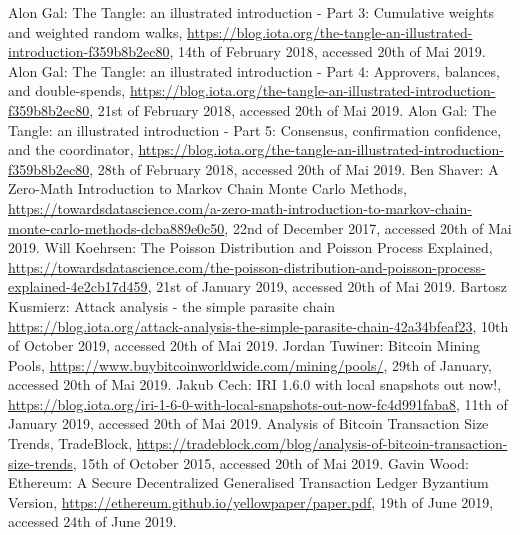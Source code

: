\begin{thebibliography}{99}
 Alon Gal: The Tangle: an illustrated introduction - Part 3: Cumulative weights and weighted random walks, \url{https://blog.iota.org/the-tangle-an-illustrated-introduction-f359b8b2ec80}, 14th of February 2018, accessed 20th of Mai 2019.
 Alon Gal: The Tangle: an illustrated introduction - Part 4: Approvers, balances, and double-spends, \url{https://blog.iota.org/the-tangle-an-illustrated-introduction-f359b8b2ec80}, 21st of February 2018, accessed 20th of Mai 2019.
 Alon Gal: The Tangle: an illustrated introduction - Part 5: Consensus, confirmation confidence, and the coordinator, \url{https://blog.iota.org/the-tangle-an-illustrated-introduction-f359b8b2ec80}, 28th of February 2018, accessed 20th of Mai 2019.
 Ben Shaver: A Zero-Math Introduction to Markov Chain Monte Carlo Methods, \url{https://towardsdatascience.com/a-zero-math-introduction-to-markov-chain-monte-carlo-methods-dcba889e0c50}, 22nd of December 2017, accessed 20th of Mai 2019.
 Will Koehrsen: The Poisson Distribution and Poisson Process Explained, \url{https://towardsdatascience.com/the-poisson-distribution-and-poisson-process-explained-4e2cb17d459}, 21st of January 2019, accessed 20th of Mai 2019.
 Bartosz Kusmierz: Attack analysis - the simple parasite chain \url{https://blog.iota.org/attack-analysis-the-simple-parasite-chain-42a34bfeaf23}, 10th of October 2019, accessed 20th of Mai 2019.
 Jordan Tuwiner: Bitcoin Mining Pools, \url{https://www.buybitcoinworldwide.com/mining/pools/}, 29th of January, accessed 20th of Mai 2019.
 Jakub Cech: IRI 1.6.0 with local snapshots out now!, \url{https://blog.iota.org/iri-1-6-0-with-local-snapshots-out-now-fc4d991faba8}, 11th of January 2019, accessed 20th of Mai 2019.
 Analysis of Bitcoin Transaction Size Trends, TradeBlock, \url{https://tradeblock.com/blog/analysis-of-bitcoin-transaction-size-trends}, 15th of October 2015, accessed 20th of Mai 2019.
 Gavin Wood: Ethereum: A Secure Decentralized Generalised Transaction Ledger Byzantium Version, \url{https://ethereum.github.io/yellowpaper/paper.pdf}, 19th of June 2019, accessed 24th of June 2019.


\end{thebibliography}

